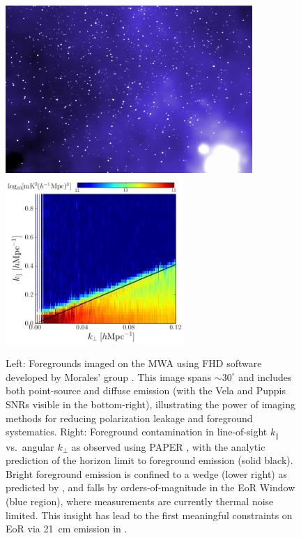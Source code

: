 \documentclass[preprint]{aastex}
\def\kperp{k_{\bot}}
\def\kpar{k_{\|}}
\begin{document}
\begin{figure}[t] \centering
\includegraphics[height=2.5in]{plots/MWApretty_crop.png} 
\includegraphics[height=2.5in]{plots/wedge_tall_wide.png} \caption{\small Left:
Foregrounds imaged on the MWA using FHD software developed by Morales' group
\citep{sullivan_et_al2012_trunc}.  This image spans $\sim$$30^{\circ}$ and
includes both point-source and diffuse emission (with the Vela and Puppis SNRs visible in the
bottom-right), illustrating the power of imaging methods for reducing
polarization leakage and foreground systematics.  
Right: Foreground contamination in line-of-sight $\kpar$ vs.\ angular $\kperp$
as observed using PAPER \citep{pober_et_al2013}, with
the analytic prediction of the horizon limit to foreground emission (solid black).
Bright foreground emission is
confined to a wedge (lower right) as predicted by
\citep{morales_et_al2012,parsons_et_al2012b,vedantham_2012,Datta_2010}, and falls
by orders-of-magnitude in the EoR Window (blue
region), where measurements are currently thermal noise limited. This insight has lead to the
first meaningful constraints on EoR via 21~cm emission in
\citet{parsons_et_al2013}.
}\label{fig:twoFGViews} \end{figure}
\end{document}
